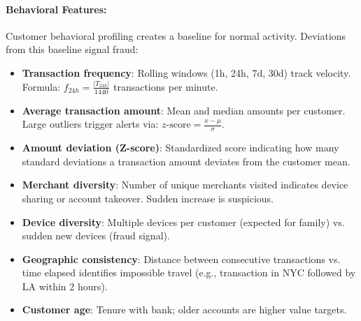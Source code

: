 \documentclass[11pt,a4paper]{article}
\begin{document}
\paragraph{Behavioral Features:}
Customer behavioral profiling creates a baseline for normal activity. Deviations from this baseline signal fraud:
\begin{itemize}
    \item \textbf{Transaction frequency}: Rolling windows (1h, 24h, 7d, 30d) track velocity. Formula: $f_{24h} = \frac{|T_{24h}|}{1440}$ transactions per minute.
    \item \textbf{Average transaction amount}: Mean and median amounts per customer. Large outliers trigger alerts via: $z\text{-score} = \frac{x - \mu}{\sigma}$.
    \item \textbf{Amount deviation (Z-score)}: Standardized score indicating how many standard deviations a transaction amount deviates from the customer mean.
    \item \textbf{Merchant diversity}: Number of unique merchants visited indicates device sharing or account takeover. Sudden increase is suspicious.
    \item \textbf{Device diversity}: Multiple devices per customer (expected for family) vs. sudden new devices (fraud signal).
    \item \textbf{Geographic consistency}: Distance between consecutive transactions vs. time elapsed identifies impossible travel (e.g., transaction in NYC followed by LA within 2 hours).
    \item \textbf{Customer age}: Tenure with bank; older accounts are higher value targets.
\end{itemize}
\end{document}
